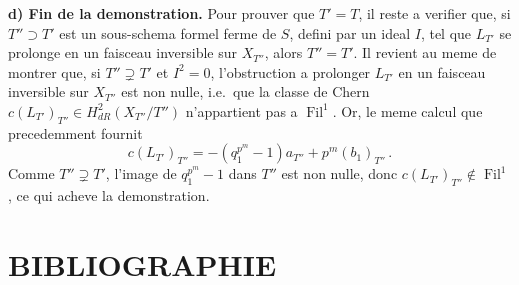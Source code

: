 \documentclass[12pt,a4paper]{article}
\theoremstyle{plain}
\theoremstyle{definition}
\theoremstyle{remark}
\DeclareMathOperator{\Fil}{Fil}
\begin{document}
\textbf{d) Fin de la demonstration.} Pour prouver que $T' = T$, il reste a verifier que, si $T'' \supset T'$ est un sous-schema formel ferme de $S$, defini par un ideal $I$, tel que $L_{T'}$ se prolonge en un faisceau inversible sur $X_{T''}$, alors $T'' = T'$. Il revient au meme de montrer que, si $T'' \supsetneq T'$ et $I^2 = 0$, l'obstruction a prolonger $L_{T'}$ en un faisceau inversible sur $X_{T''}$ est non nulle, i.e.\ que la classe de Chern $c(L_{T'})_{T''} \in H_{dR}^2(X_{T''}/T'')$ n'appartient pas a $\Fil^1$. Or, le meme calcul que precedemment fournit
\[
c(L_{T'})_{T''} = -(q_1^{p^m} - 1)a_{T''} + p^m(b_1)_{T''}\,.\]
Comme $T'' \supsetneq T'$, l'image de $q_1^{p^m} - 1$ dans $T''$ est non nulle, donc $c(L_{T'})_{T''} \notin \Fil^1$, ce qui acheve la demonstration.

\section*{BIBLIOGRAPHIE}
\end{document}
